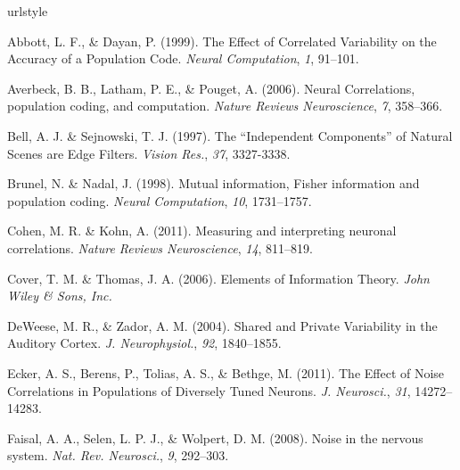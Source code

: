 \documentclass[12pt]{article}
\begin{document}
\newpage
\begin{thebibliography}{100}
\providecommand{\natexlab}[1]{#1}
\expandafter\ifx\csname urlstyle\endcsname\relax
  \providecommand{\doi}[1]{doi:\discretionary{}{}{}#1}\else
  \providecommand{\doi}{doi:\discretionary{}{}{}\begingroup
  \urlstyle{rm}\Url}\fi


Abbott, L. F., \& Dayan, P. (1999).
\newblock The Effect of Correlated Variability on the Accuracy of a Population Code.
\newblock \emph{Neural Computation}, \emph{1}, 91--101.

Averbeck, B. B., Latham, P. E., \& Pouget, A. (2006).
\newblock Neural Correlations, population coding, and computation.
\newblock \emph{Nature Reviews Neuroscience}, \emph{7}, 358--366.

Bell, A. J. \& Sejnowski, T. J. (1997).
\newblock The ``Independent Components'' of Natural Scenes are Edge Filters.
\newblock \emph{Vision Res.}, \emph{37}, 3327-3338.

Brunel, N. \& Nadal, J. (1998).
\newblock Mutual information, Fisher information and population coding.
\newblock \emph{Neural Computation}, \emph{10}, 1731--1757.

Cohen, M. R. \& Kohn, A. (2011).
\newblock Measuring and interpreting neuronal correlations.
\newblock \emph{Nature Reviews Neuroscience}, \emph{14}, 811--819.

Cover, T. M. \& Thomas, J. A. (2006).
\newblock Elements of Information Theory.
\newblock \emph{John Wiley \& Sons, Inc.}

DeWeese, M. R., \& Zador, A. M. (2004).
\newblock Shared and Private Variability in the Auditory Cortex.
\newblock \emph{J. Neurophysiol.}, \emph{92}, 1840--1855.

Ecker, A. S., Berens, P., Tolias, A. S., \& Bethge, M. (2011).
\newblock The Effect of Noise Correlations in Populations of Diversely Tuned Neurons.
\newblock \emph{J. Neurosci.}, \emph{31}, 14272--14283.

Faisal, A. A., Selen, L. P. J., \& Wolpert, D. M. (2008).
\newblock Noise in the nervous system.
\newblock \emph{Nat. Rev. Neurosci.}, \emph{9}, 292--303.


\end{thebibliography}
\end{document}
